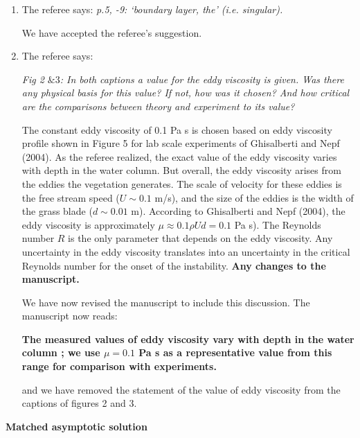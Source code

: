 \documentclass[letterpaper,10pt]{article}
\newcommand{\Rey}{{R}}
\begin{document}
\begin{enumerate}
\item The referee says:
\textit{
p.5, -9: `boundary layer, the' (i.e. singular).
}

We have accepted the referee's suggestion.

\item The referee says:

\textit{  Fig 2 $\& 3$:
In both captions a value for the eddy viscosity is given. Was there any physical basis for this value? If not, how was it chosen? And how critical are the comparisons between theory and experiment to its value?
}

The constant eddy viscosity of 0.1 Pa s is chosen based on eddy viscosity profile shown in Figure 5 for lab scale experiments of Ghisalberti and Nepf (2004). As the referee realized, the exact value of the eddy viscosity varies with depth in the water column. But overall, the eddy viscosity arises from the eddies the vegetation generates. The scale of velocity for these eddies is the free stream speed ($U \sim 0.1$ m/s), and the size of the eddies is the width of the grass blade ($d \sim 0.01$ m). According to Ghisalberti and Nepf (2004), the eddy viscosity is approximately $\mu \approx 0.1 \rho U d = 0.1$ Pa s). The Reynolds number $\Rey$ is the only parameter that depends on the eddy viscosity. Any uncertainty in the eddy viscosity translates into an uncertainty in the critical Reynolds number for the onset of the instability. {\bf Any changes to the manuscript.}

We have now revised the manuscript to include this discussion. The manuscript now reads:

\textbf{
The measured values of eddy viscosity vary with depth in the water column \citep{Nepf04}; we use $\mu= 0.1$ Pa s as a representative value from this range for comparison with experiments.
}

and we have removed the statement of the value of eddy viscosity from the captions of figures 2 and 3.

\end{enumerate}

\newpage
\centerline{\textbf{Matched asymptotic solution}}
\end{document}
